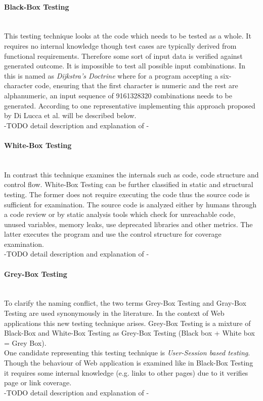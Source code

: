 \documentclass[12pt, notitlepage]{article}
\begin{document}
\paragraph{Black-Box Testing} ~\\
This testing technique looks at the code which needs to be tested as a whole. It requires no internal knowledge though test cases are typically 
derived from functional requirements. Therefore some sort of input data is verified against generated outcome.
It is impossible to test all possible input combinations. In \cite{softare-testing-principles} this is named as \textit{Dijkstra's Doctrine}
where for a program accepting a six-character code, ensuring that the first character is numeric and the rest are alphanumeric, an input 
sequence of 9161328320 combinations needs to be generated.
According to \cite{testing-overview} one representative implementing this approach proposed by Di Lucca et al.\cite{decision-table-testing} will be described below.\\
-TODO detail description and explanation of \cite{decision-table-testing}-
\paragraph{White-Box Testing} ~\\
In contrast this technique examines the internals such as code, code structure and control flow. White-Box Testing can be further classified in
static and structural testing. The former does not require executing the code thus the source code is sufficient for examination. The source code
is analyzed either by humans through a code review or by static analysis tools which check for unreachable code, unused variables, memory leaks, use
deprecated libraries and other metrics. The latter executes the program and use the control structure for coverage examination\cite{structural-testing}.\\
-TODO detail description and explanation of \cite{web-whiteBox-testing}-
\paragraph{Grey-Box Testing} ~\\
To clarify the naming conflict, the two terms Grey-Box Testing and Gray-Box Testing are used synonymously in the literature\cite{bridge-grey}. 
In the context of Web applications this new testing technique arises\cite{web-engineering}. Grey-Box Testing is a mixture of Black-Box and White-Box Testing as Grey-Box Testing (Black box + White box = Grey Box).\\
One candidate representing this testing technique is \textit{User-Session based testing}. Though the behaviour of Web application is examined like in
Black-Box Testing it requires some internal knowledge (e.g. links to other pages) due to it verifies page or link coverage.\\
-TODO detail description and explanation of \cite{user-session}-
\end{document}
